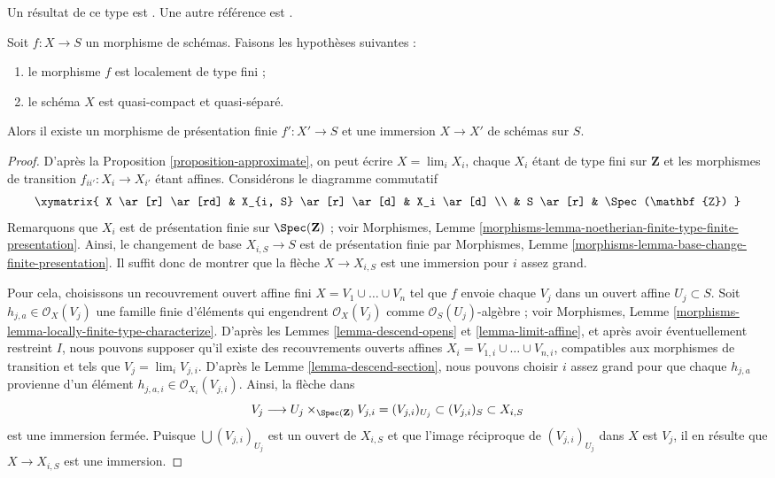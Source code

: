 \noindent
Un résultat de ce type est \cite[Satz 2.10]{Kiehl}. Une autre référence est
\cite{Conrad-Nagata}.

\begin{lemma}
\label{lemma-locally-finite-type-in-finite-presentation}
Soit $f : X \to S$ un morphisme de schémas. Faisons les hypothèses suivantes :
\begin{enumerate}
\item le morphisme $f$ est localement de type fini ;
\item le schéma $X$ est quasi-compact et quasi-séparé.
\end{enumerate}
Alors il existe un morphisme de présentation finie $f' : X' \to S$ et une
immersion $X \to X'$ de schémas sur $S$.
\end{lemma}

\begin{proof}
D'après la Proposition \ref{proposition-approximate}, on peut écrire
$X = \lim_i X_i$, chaque $X_i$ étant de type fini sur $\mathbf{Z}$ et les
morphismes de transition $f_{ii'} : X_i \to X_{i'}$ étant affines.
Considérons le diagramme commutatif
$$
\xymatrix{
X \ar[r] \ar[rd] & X_{i, S} \ar[r] \ar[d] & X_i \ar[d] \\
& S \ar[r] & \Spec(\mathbf{Z})
}
$$
Remarquons que $X_i$ est de présentation finie sur $\Spec(\mathbf{Z})$ ;
voir Morphismes,
Lemme \ref{morphisms-lemma-noetherian-finite-type-finite-presentation}.
Ainsi, le changement de base $X_{i, S} \to S$ est de présentation finie par
Morphismes, Lemme \ref{morphisms-lemma-base-change-finite-presentation}. Il
suffit donc de montrer que la flèche $X \to X_{i, S}$ est une immersion pour
$i$ assez grand.

\medskip\noindent
Pour cela, choisissons un recouvrement ouvert affine fini
$X = V_1 \cup \ldots \cup V_n$ tel que $f$ envoie chaque $V_j$ dans un ouvert
affine $U_j \subset S$. Soit $h_{j, a} \in \mathcal{O}_X(V_j)$ une famille
finie d'éléments qui engendrent $\mathcal{O}_X(V_j)$ comme
$\mathcal{O}_S(U_j)$-algèbre ; voir Morphismes,
Lemme \ref{morphisms-lemma-locally-finite-type-characterize}. D'après les
Lemmes \ref{lemma-descend-opens} et \ref{lemma-limit-affine}, et après avoir
éventuellement restreint $I$, nous pouvons supposer qu'il existe des
recouvrements ouverts affines $X_i = V_{1, i} \cup \ldots \cup V_{n, i}$,
compatibles aux morphismes de transition et tels que
$V_j = \lim_i V_{j, i}$. D'après le Lemme \ref{lemma-descend-section}, nous
pouvons choisir $i$ assez grand pour que chaque $h_{j, a}$ provienne d'un
élément $h_{j, a, i} \in \mathcal{O}_{X_i}(V_{j, i})$. Ainsi, la flèche dans
$$
V_j \longrightarrow U_j \times_{\Spec(\mathbf{Z})} V_{j, i} =
(V_{j, i})_{U_j} \subset (V_{j, i})_S \subset X_{i, S}
$$
est une immersion fermée. Puisque $\bigcup (V_{j, i})_{U_j}$ est un ouvert
de $X_{i, S}$ et que l'image réciproque de $(V_{j, i})_{U_j}$ dans $X$ est
$V_j$, il en résulte que $X \to X_{i, S}$ est une immersion.
\end{proof}

